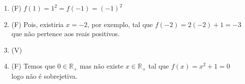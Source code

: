 \begin{enumerate}
		\item (F) $f(1)=1^2 =f(-1)=(-1)^2$
		\item (F) Pois, existiria $x=-2$, por exemplo, tal que $f(-2)=2(-2)+1=-3$ que não pertence aos reais positivos.
		\item (V) 
		\item (F) Temos que $0\in\mathbb{R}_{+}$ mas não existe $x\in\mathbb{R}_{+}$ tal que $f(x)=x^2+1=0$ logo não é sobrejetiva.
\end{enumerate}
